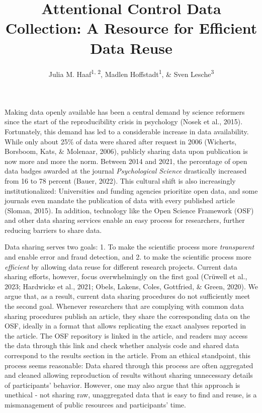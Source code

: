 \documentclass[
  man,floatsintext]{apa6}
\title{Attentional Control Data Collection: A Resource for Efficient Data Reuse}
\author{Julia M. Haaf\textsuperscript{1, 2}, Madlen Hoffstadt\textsuperscript{1}, \& Sven Lesche\textsuperscript{3}}
\date{}
\affiliation{\vspace{0.5cm}\textsuperscript{1} University of Amsterdam\\\textsuperscript{2} University of Potsdam\\\textsuperscript{3} University of Heidelberg}
\begin{document}
\maketitle

Making data openly available has been a central demand by science reformers since the start of the reproducibility crisis in psychology (Nosek et al., 2015). Fortunately, this demand has led to a considerable increase in data availability. While only about 25\% of data were shared after request in 2006 (Wicherts, Borsboom, Kats, \& Molenaar, 2006), publicly sharing data upon publication is now more and more the norm. Between 2014 and 2021, the percentage of open data badges awarded at the journal \emph{Psychological Science} drastically increased from 16 to 78 percent (Bauer, 2022). This cultural shift is also increasingly institutionalized: Universities and funding agencies prioritize open data, and some journals even mandate the publication of data with every published article (Sloman, 2015). In addition, technology like the Open Science Framework (OSF) and other data sharing services enable an easy process for researchers, further reducing barriers to share data.

Data sharing serves two goals: 1. To make the scientific process more \emph{transparent} and enable error and fraud detection, and 2. to make the scientific process more \emph{efficient} by allowing data reuse for different research projects. Current data sharing efforts, however, focus overwhelmingly on the first goal (Crüwell et al., 2023; Hardwicke et al., 2021; Obels, Lakens, Coles, Gottfried, \& Green, 2020). We argue that, as a result, current data sharing procedures do not sufficiently meet the second goal. Whenever researchers that are complying with common data sharing procedures publish an article, they share the corresponding data on the OSF, ideally in a format that allows replicating the exact analyses reported in the article. The OSF repository is linked in the article, and readers may access the data through this link and check whether analysis code and shared data correspond to the results section in the article. From an ethical standpoint, this process seems reasonable: Data shared through this process are often aggregated and cleaned allowing reproduction of results without sharing unnecessary details of participants' behavior. However, one may also argue that this approach is unethical - not sharing raw, unaggregated data that is easy to find and reuse, is a mismanagement of public resources and participants' time.
\end{document}
